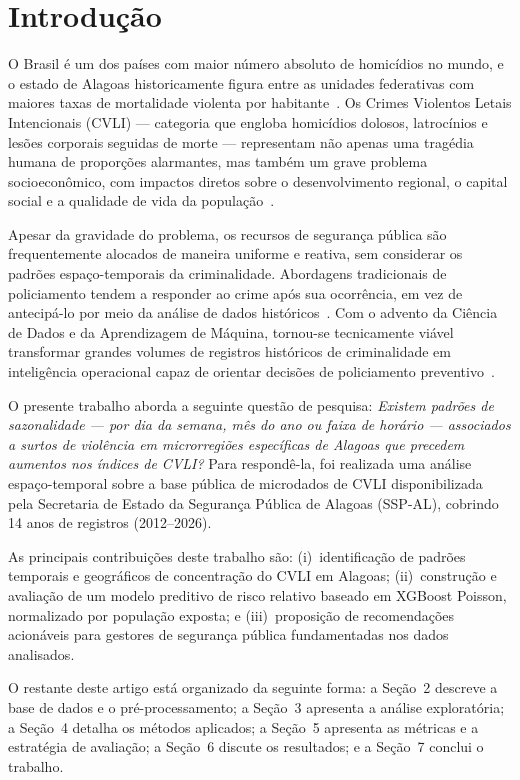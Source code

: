 \documentclass[12pt]{article}
\begin{document}
\section{Introdução}
O Brasil é um dos países com maior número absoluto de homicídios no mundo,
e o estado de Alagoas historicamente figura entre as unidades federativas com
maiores taxas de mortalidade violenta por habitante~\cite{ipea:2021}. Os
Crimes Violentos Letais Intencionais (CVLI) — categoria que engloba homicídios
dolosos, latrocínios e lesões corporais seguidas de morte — representam não
apenas uma tragédia humana de proporções alarmantes, mas também um grave
problema socioeconômico, com impactos diretos sobre o desenvolvimento
regional, o capital social e a qualidade de vida da
população~\cite{cerqueira:2014}.

Apesar da gravidade do problema, os recursos de segurança pública são
frequentemente alocados de maneira uniforme e reativa, sem considerar os
padrões espaço-temporais da criminalidade. Abordagens tradicionais de
policiamento tendem a responder ao crime após sua ocorrência, em vez de
antecipá-lo por meio da análise de dados históricos~\cite{sherman:1989}.
Com o advento da Ciência de Dados e da Aprendizagem de Máquina, tornou-se
tecnicamente viável transformar grandes volumes de registros históricos de
criminalidade em inteligência operacional capaz de orientar decisões de
policiamento preventivo~\cite{buczak:2016}.

O presente trabalho aborda a seguinte questão de pesquisa: \textit{Existem
padrões de sazonalidade — por dia da semana, mês do ano ou faixa de horário
— associados a surtos de violência em microrregiões específicas de Alagoas
que precedem aumentos nos índices de CVLI?} Para respondê-la, foi realizada
uma análise espaço-temporal sobre a base pública de microdados de CVLI
disponibilizada pela Secretaria de Estado da Segurança Pública de Alagoas
(SSP-AL), cobrindo 14 anos de registros (2012--2026).

As principais contribuições deste trabalho são: (i)~identificação de padrões
temporais e geográficos de concentração do CVLI em Alagoas; (ii)~construção
e avaliação de um modelo preditivo de risco relativo baseado em XGBoost
Poisson, normalizado por população exposta; e (iii)~proposição de
recomendações acionáveis para gestores de segurança pública fundamentadas
nos dados analisados.

O restante deste artigo está organizado da seguinte forma: a Seção~2
descreve a base de dados e o pré-processamento; a Seção~3 apresenta a
análise exploratória; a Seção~4 detalha os métodos aplicados; a Seção~5
apresenta as métricas e a estratégia de avaliação; a Seção~6 discute os
resultados; e a Seção~7 conclui o trabalho.
\end{document}
